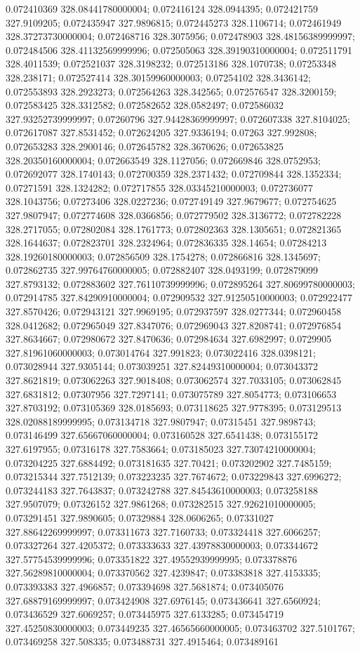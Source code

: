 0.072410369 328.08441780000004; 0.072416124 328.0944395; 0.072421759 327.9109205; 0.072435947 327.9896815; 0.072445273 328.1106714; 0.072461949 328.37273730000004; 0.072468716 328.3075956; 0.072478903 328.48156389999997; 0.072484506 328.41132569999996; 0.072505063 328.39190310000004; 0.072511791 328.4011539; 0.072521037 328.3198232; 0.072513186 328.1070738; 0.07253348 328.238171; 0.072527414 328.30159960000003; 0.07254102 328.3436142; 0.072553893 328.2923273; 0.072564263 328.342565; 0.072576547 328.3200159; 0.072583425 328.3312582; 0.072582652 328.0582497; 0.072586032 327.93252739999997; 0.07260796 327.94428369999997; 0.072607338 327.8104025; 0.072617087 327.8531452; 0.072624205 327.9336194; 0.07263 327.992808; 0.072653283 328.2900146; 0.072645782 328.3670626; 0.072653825 328.20350160000004; 0.072663549 328.1127056; 0.072669846 328.0752953; 0.072692077 328.1740143; 0.072700359 328.2371432; 0.072709844 328.1352334; 0.07271591 328.1324282; 0.072717855 328.03345210000003; 0.072736077 328.1043756; 0.07273406 328.0227236; 0.072749149 327.9679677; 0.072754625 327.9807947; 0.072774608 328.0366856; 0.072779502 328.3136772; 0.072782228 328.2717055; 0.072802084 328.1761773; 0.072802363 328.1305651; 0.072821365 328.1644637; 0.072823701 328.2324964; 0.072836335 328.14654; 0.07284213 328.19260180000003; 0.072856509 328.1754278; 0.072866816 328.1345697; 0.072862735 327.99764760000005; 0.072882407 328.0493199; 0.072879099 327.8793132; 0.072883602 327.76110739999996; 0.072895264 327.80699780000003; 0.072914785 327.84290910000004; 0.072909532 327.91250510000003; 0.072922477 327.8570426; 0.072943121 327.9969195; 0.072937597 328.0277344; 0.072960458 328.0412682; 0.072965049 327.8347076; 0.072969043 327.8208741; 0.072976854 327.8634667; 0.072980672 327.8470636; 0.072984634 327.6982997; 0.0729905 327.81961060000003; 0.073014764 327.991823; 0.073022416 328.0398121; 0.073028944 327.9305144; 0.073039251 327.82449310000004; 0.073043372 327.8621819; 0.073062263 327.9018408; 0.073062574 327.7033105; 0.073062845 327.6831812; 0.07307956 327.7297141; 0.073075789 327.8054773; 0.073106653 327.8703192; 0.073105369 328.0185693; 0.073118625 327.9778395; 0.073129513 328.02088189999995; 0.073134718 327.9807947; 0.07315451 327.9898743; 0.073146499 327.65667060000004; 0.073160528 327.6541438; 0.073155172 327.6197955; 0.07316178 327.7583664; 0.073185023 327.73074210000004; 0.073204225 327.6884492; 0.073181635 327.70421; 0.073202902 327.7485159; 0.073215344 327.7512139; 0.073223235 327.7674672; 0.073229843 327.6996272; 0.073244183 327.7643837; 0.073242788 327.84543610000003; 0.073258188 327.9507079; 0.07326152 327.9861268; 0.073282515 327.92621010000005; 0.073291451 327.9890605; 0.07329884 328.0606265; 0.07331027 327.88642269999997; 0.073311673 327.7160733; 0.073324418 327.6066257; 0.073327264 327.4205372; 0.073333633 327.43978830000003; 0.073344672 327.57754539999996; 0.073351822 327.49552939999995; 0.073378876 327.56289810000004; 0.073370562 327.4239847; 0.073383818 327.4153335; 0.073393383 327.4966857; 0.073394698 327.5681874; 0.073405076 327.68879169999997; 0.073424908 327.6976145; 0.073436641 327.6560924; 0.073436529 327.6069257; 0.073445975 327.6133285; 0.073454719 327.45250830000003; 0.073449235 327.46565660000005; 0.073463702 327.5101767; 0.073469258 327.508335; 0.073488731 327.4915464; 0.073489161 